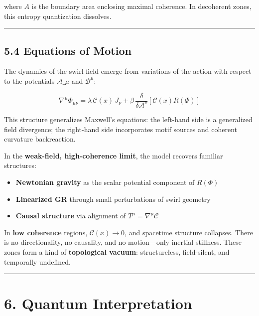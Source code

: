 \documentclass[
  11pt,
]{article}
\providecommand{\tightlist}{%
  \setlength{\itemsep}{0pt}\setlength{\parskip}{0pt}}
\begin{document}
where \(A\) is the boundary area enclosing maximal coherence. In
decoherent zones, this entropy quantization dissolves.

\begin{center}\rule{0.5\linewidth}{0.5pt}\end{center}

\subsection{5.4 Equations of Motion}\label{equations-of-motion}

The dynamics of the swirl field emerge from variations of the action
with respect to the potentials \(\mathcal{A}\_\mu\) and
\(\mathcal{B}^\mu\):

\[
\nabla^\mu \Phi_{\mu\nu} = \lambda\, \mathcal{C}(x)\, J_\nu + \beta\, \frac{\delta}{\delta \mathcal{A}^\nu} \left[ \mathcal{C}(x) R(\Phi) \right]
\]

This structure generalizes Maxwell's equations: the left-hand side is a
generalized field divergence; the right-hand side incorporates motif
sources and coherent curvature backreaction.

In the \textbf{weak-field, high-coherence limit}, the model recovers
familiar structures:

\begin{itemize}
\tightlist
\item
  \textbf{Newtonian gravity} as the scalar potential component of
  \(R(\Phi)\)
\item
  \textbf{Linearized GR} through small perturbations of swirl geometry
\item
  \textbf{Causal structure} via alignment of
  \(T^\mu = \nabla^\mu \mathcal{C}\)
\end{itemize}

In \textbf{low coherence} regions, \(\mathcal{C}(x) \to 0\), and
spacetime structure collapses. There is no directionality, no causality,
and no motion---only inertial stillness. These zones form a kind of
\textbf{topological vacuum}: structureless, field-silent, and temporally
undefined.

\begin{center}\rule{0.5\linewidth}{0.5pt}\end{center}

\section{6. Quantum Interpretation}\label{quantum-interpretation}
\end{document}

